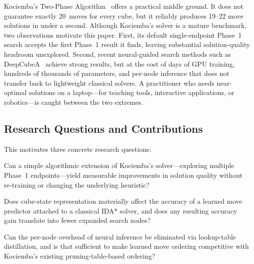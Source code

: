 \documentclass[graybox]{svmult}
\begin{document}
Kociemba's Two-Phase Algorithm~\cite{kociemba} offers a practical middle ground. It does not guarantee exactly 20~moves for every cube, but it reliably produces 19--22 move solutions in under a second. Although Kociemba's solver is a mature benchmark, two observations motivate this paper. First, its default single-endpoint Phase~1 search accepts the first Phase~1 result it finds, leaving substantial solution-quality headroom unexplored. Second, recent neural-guided search methods such as DeepCubeA~\cite{deepcubea} achieve strong results, but at the cost of days of GPU training, hundreds of thousands of parameters, and per-node inference that does not transfer back to lightweight classical solvers. A practitioner who needs near-optimal solutions on a laptop---for teaching tools, interactive applications, or robotics---is caught between the two extremes.

\subsection{Research Questions and Contributions}
\label{sec:contributions}
This motivates three concrete research questions:
\begin{description}[leftmargin=1.2em, style=nextline]
  \item[\textbf{RQ1}] Can a simple algorithmic extension of Kociemba's solver---exploring multiple Phase~1 endpoints---yield measurable improvements in solution quality without re-training or changing the underlying heuristic?
  \item[\textbf{RQ2}] Does cube-state representation materially affect the accuracy of a learned move predictor attached to a classical IDA* solver, and does any resulting accuracy gain translate into fewer expanded search nodes?
  \item[\textbf{RQ3}] Can the per-node overhead of neural inference be eliminated via lookup-table distillation, and is that sufficient to make learned move ordering competitive with Kociemba's existing pruning-table-based ordering?
\end{description}
\end{document}
